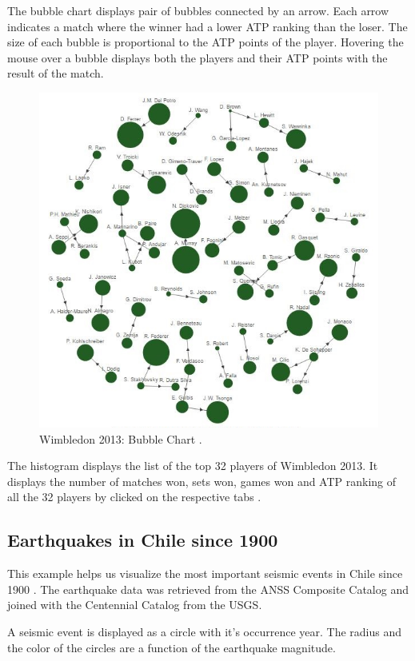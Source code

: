 \documentclass[9pt,twocolumn,twoside]{../../styles/osajnl}
\begin{document}
The bubble chart displays pair of bubbles connected by an arrow. Each arrow indicates a match where the winner had a lower ATP ranking than the loser. The size of each bubble is proportional to the ATP points of the player. Hovering the mouse over a bubble displays both the players and their ATP points with the result of the match. 

\begin{figure}[h]
\centering
\includegraphics[scale=0.3]{images/2}
\centering
\caption{Wimbledon 2013: Bubble Chart \cite{www-bubble}.}
\end{figure}

The histogram displays the list of the top 32 players of Wimbledon 2013. It displays the number of matches won, sets won, games won and ATP ranking of all the 32 players by clicked on the respective tabs \cite{www-hist}.  

\subsection{Earthquakes in Chile since 1900}
This example helps us visualize the most important seismic events in Chile since 1900 \cite{www-map}. The earthquake data was retrieved from the ANSS Composite Catalog and joined with the Centennial Catalog from the USGS. 

 A seismic event is displayed as a circle with it's occurrence year. The radius and the color of the circles are a function of the earthquake magnitude. 
\end{document}
